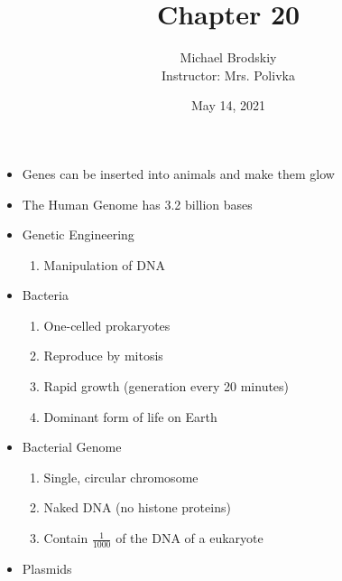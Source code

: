 \documentclass[12pt]{article}
\title{Chapter 20}
\date{May 14, 2021}
\author{Michael Brodskiy\\ \small Instructor: Mrs. Polivka}
\begin{document}
\maketitle

\begin{itemize}

  \item Genes can be inserted into animals and make them glow

  \item The Human Genome has 3.2 billion bases

  \item Genetic Engineering

    \begin{enumerate}

      \item Manipulation of DNA

    \end{enumerate}

  \item Bacteria

    \begin{enumerate}

      \item One-celled prokaryotes

      \item Reproduce by mitosis

      \item Rapid growth (generation every 20 minutes)

      \item Dominant form of life on Earth

    \end{enumerate}

  \item Bacterial Genome

    \begin{enumerate}

      \item Single, circular chromosome

      \item Naked DNA (no histone proteins)

      \item Contain $\frac{1}{1000}$ of the DNA of a eukaryote

    \end{enumerate}

  \item Plasmids

    \begin{enumerate}


\end{enumerate}
\end{itemize}
\end{document}
